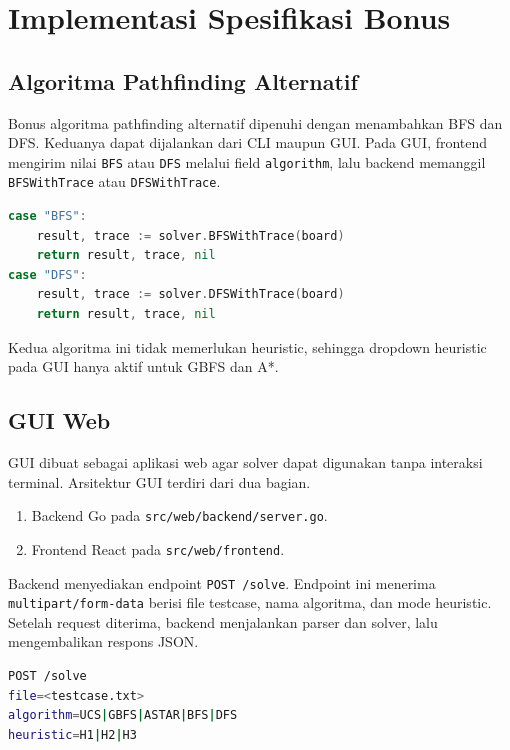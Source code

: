 \section{Implementasi Spesifikasi Bonus}\label{sub:Implementasi Spesifikasi Bonus}

\subsection{Algoritma Pathfinding Alternatif}\label{sub:Algoritma Pathfinding Alternatif}

Bonus algoritma pathfinding alternatif dipenuhi dengan menambahkan BFS
dan DFS. Keduanya dapat dijalankan dari CLI maupun GUI. Pada GUI,
frontend mengirim nilai \texttt{BFS} atau \texttt{DFS} melalui field
\texttt{algorithm}, lalu backend memanggil \texttt{BFSWithTrace} atau
\texttt{DFSWithTrace}.

\begin{lstlisting}[language=Go, basicstyle=\ttfamily\small, breaklines=true]
case "BFS":
    result, trace := solver.BFSWithTrace(board)
    return result, trace, nil
case "DFS":
    result, trace := solver.DFSWithTrace(board)
    return result, trace, nil
\end{lstlisting}

Kedua algoritma ini tidak memerlukan heuristic, sehingga dropdown
heuristic pada GUI hanya aktif untuk GBFS dan A*.

\subsection{GUI Web}\label{sub:GUI}

GUI dibuat sebagai aplikasi web agar solver dapat digunakan tanpa
interaksi terminal. Arsitektur GUI terdiri dari dua bagian.
\begin{enumerate}
    \item Backend Go pada \texttt{src/web/backend/server.go}.
    \item Frontend React pada \texttt{src/web/frontend}.
\end{enumerate}

Backend menyediakan endpoint \texttt{POST /solve}. Endpoint ini
menerima \texttt{multipart/form-data} berisi file testcase, nama
algoritma, dan mode heuristic. Setelah request diterima, backend
menjalankan parser dan solver, lalu mengembalikan respons JSON.

\begin{lstlisting}[language=bash, basicstyle=\ttfamily\small, breaklines=true]
POST /solve
file=<testcase.txt>
algorithm=UCS|GBFS|ASTAR|BFS|DFS
heuristic=H1|H2|H3
\end{lstlisting}

